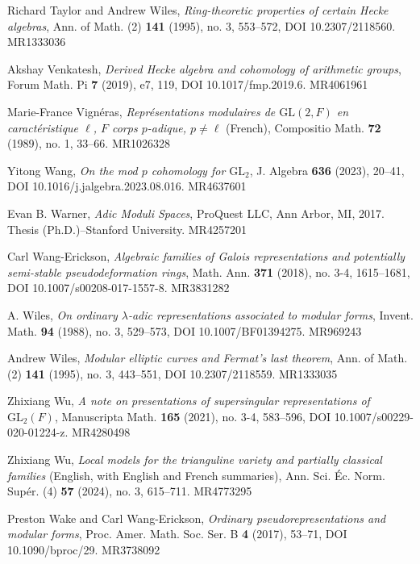 \item[{[TW95]}] Richard Taylor and Andrew Wiles, \emph{Ring-theoretic properties of certain Hecke algebras}, Ann. of Math. (2) \textbf{141} (1995), no. 3, 553--572, DOI 10.2307/2118560. MR1333036
\item[{[Ven19]}] Akshay Venkatesh, \emph{Derived Hecke algebra and cohomology of arithmetic groups}, Forum Math. Pi \textbf{7} (2019), e7, 119, DOI 10.1017/fmp.2019.6. MR4061961
\item[{[Vig89]}] Marie-France Vign\'eras, \emph{Repr\'esentations modulaires de $\mathrm{GL}(2,F)$ en caract\'eristique $\ell$, $F$ corps $p$-adique, $p\neq\ell$} (French), Compositio Math. \textbf{72} (1989), no. 1, 33--66. MR1026328
\item[{[Wan23]}] Yitong Wang, \emph{On the mod $p$ cohomology for $\mathrm{GL}_2$}, J. Algebra \textbf{636} (2023), 20--41, DOI 10.1016/j.jalgebra.2023.08.016. MR4637601
\item[{[War17]}] Evan B. Warner, \emph{Adic Moduli Spaces}, ProQuest LLC, Ann Arbor, MI, 2017. Thesis (Ph.D.)--Stanford University. MR4257201
\item[{[WE18]}] Carl Wang-Erickson, \emph{Algebraic families of Galois representations and potentially semi-stable pseudodeformation rings}, Math. Ann. \textbf{371} (2018), no. 3-4, 1615--1681, DOI 10.1007/s00208-017-1557-8. MR3831282
\item[{[Wil88]}] A. Wiles, \emph{On ordinary $\lambda$-adic representations associated to modular forms}, Invent. Math. \textbf{94} (1988), no. 3, 529--573, DOI 10.1007/BF01394275. MR969243
\item[{[Wil95]}] Andrew Wiles, \emph{Modular elliptic curves and Fermat's last theorem}, Ann. of Math. (2) \textbf{141} (1995), no. 3, 443--551, DOI 10.2307/2118559. MR1333035
\item[{[Wu21]}] Zhixiang Wu, \emph{A note on presentations of supersingular representations of $\mathrm{GL}_2(F)$}, Manuscripta Math. \textbf{165} (2021), no. 3-4, 583--596, DOI 10.1007/s00229-020-01224-z. MR4280498
\item[{[Wu24]}] Zhixiang Wu, \emph{Local models for the trianguline variety and partially classical families} (English, with English and French summaries), Ann. Sci. \'Ec. Norm. Sup\'er. (4) \textbf{57} (2024), no. 3, 615--711. MR4773295
\item[{[WWE17]}] Preston Wake and Carl Wang-Erickson, \emph{Ordinary pseudorepresentations and modular forms}, Proc. Amer. Math. Soc. Ser. B \textbf{4} (2017), 53--71, DOI 10.1090/bproc/29. MR3738092
